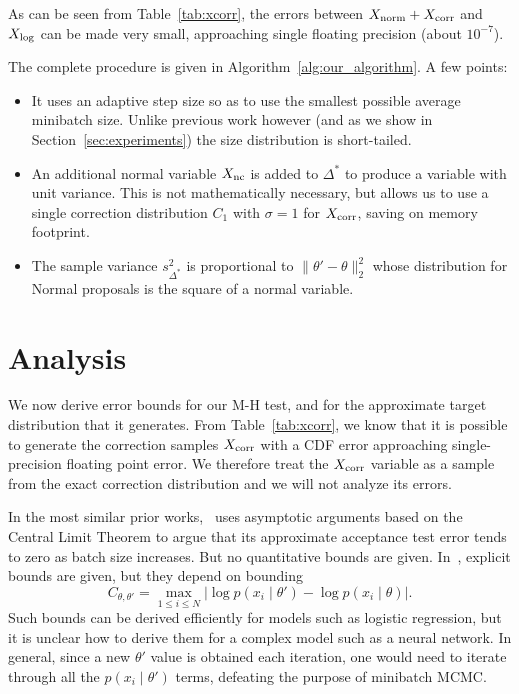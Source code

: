 \documentclass[twoside]{article} \usepackage{aistats2017}
\begin{document}
As can be seen from Table~\ref{tab:xcorr}, the errors between $X_{\rm
norm}+X_{\rm corr}$ and $X_{\rm log}$ can be made very small, approaching single
floating precision (about $10^{-7}$). 

The complete procedure is given in Algorithm~\ref{alg:our_algorithm}. A few points:

\begin{itemize}
    \item It uses an adaptive step size so as to use the smallest possible
    average minibatch size. Unlike previous work however (and as we show in
    Section~\ref{sec:experiments}) the size distribution is short-tailed.

    \item An additional normal variable $X_{\rm nc}$ is added to $\Delta^*$ to
    produce a variable with unit variance. This is not mathematically necessary,
    but allows us to use a single correction distribution $C_1$ with $\sigma=1$
    for $X_{\rm corr}$, saving on memory footprint.

    \item The sample variance $s^2_{\Delta^*}$ is proportional to
    $\|\theta'-\theta\|_2^2$ whose distribution for Normal proposals is the
    square of a normal variable. 
\end{itemize}



\section{Analysis}\label{sec:analysis}

We now derive error bounds for our M-H test, and for the approximate target
distribution that it generates. From Table~\ref{tab:xcorr}, we know that
it is possible to generate the correction samples $X_{\rm corr}$ with a CDF
error approaching single-precision floating point error. We therefore treat the
$X_{\rm corr}$ variable as a sample from the exact correction distribution and
we will not analyze its errors.

In the most similar prior works,~\citet{cutting_mh_2014} uses asymptotic
arguments based on the Central Limit Theorem to argue that its approximate
acceptance test error tends to zero as batch size increases. But no quantitative
bounds are given. In~\citet{icml2014c1_bardenet14}, explicit bounds are given,
but they depend on bounding
\begin{equation}\label{eq:bad_bound}
    C_{\theta, \theta'} = \max_{1\leq i\leq N}|\log p(x_i\mid\theta') - \log p(x_i\mid\theta)|.
\end{equation}
Such bounds can be derived efficiently for models such as logistic regression,
but it is unclear how to derive them for a complex model such as a neural
network. In general, since a new $\theta'$ value is obtained each iteration, one
would need to iterate through all the $p(x_i\mid \theta')$ terms, defeating the
purpose of minibatch MCMC.
\end{document}
